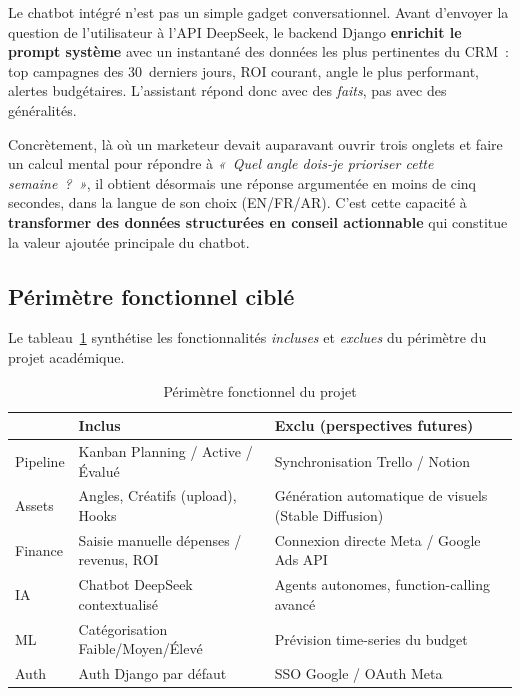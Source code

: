 Le chatbot intégré n'est pas un simple gadget conversationnel. Avant
d'envoyer la question de l'utilisateur à l'API DeepSeek, le backend Django
\textbf{enrichit le prompt système} avec un instantané des données les plus
pertinentes du CRM~: top campagnes des 30~derniers jours, ROI courant,
angle le plus performant, alertes budgétaires. L'assistant répond donc avec
des \emph{faits}, pas avec des généralités.

Concrètement, là où un marketeur devait auparavant ouvrir trois onglets et
faire un calcul mental pour répondre à \emph{«~Quel angle dois-je
prioriser cette semaine~?~»}, il obtient désormais une réponse argumentée en
moins de cinq secondes, dans la langue de son choix (EN/FR/AR). C'est cette
capacité à \textbf{transformer des données structurées en conseil
actionnable} qui constitue la valeur ajoutée principale du chatbot.

\subsection{Périmètre fonctionnel ciblé}

Le tableau~\ref{tab:perimetre} synthétise les fonctionnalités
\emph{incluses} et \emph{exclues} du périmètre du projet académique.

\begin{table}[H]
    \centering
    \begin{tabularx}{\textwidth}{lXX}
        \toprule
        & \textbf{Inclus} & \textbf{Exclu (perspectives futures)}\\
        \midrule
        Pipeline & Kanban Planning / Active / Évalué & Synchronisation
        Trello / Notion\\
        Assets & Angles, Créatifs (upload), Hooks & Génération automatique
        de visuels (Stable Diffusion)\\
        Finance & Saisie manuelle dépenses / revenus, ROI & Connexion
        directe Meta / Google Ads API\\
        IA & Chatbot DeepSeek contextualisé & Agents autonomes,
        function-calling avancé\\
        ML & Catégorisation Faible/Moyen/Élevé & Prévision time-series du
        budget\\
        Auth & Auth Django par défaut & SSO Google / OAuth Meta\\
        \bottomrule
    \end{tabularx}
    \caption{Périmètre fonctionnel du projet}
    \label{tab:perimetre}
\end{table}
